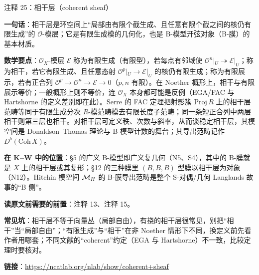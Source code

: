 \begin{kcard}{注释 25：相干层（coherent sheaf）}

\textbf{一句话}：相干层是环空间上“局部由有限个截生成、且任意有限个截之间的核仍有限生成”的 $\mathcal O$-模层；它是有限生成模的几何化，也是 B-模型开弦对象（B-膜）的基本材质。

\textbf{数学要点}：$\mathcal O_X$-模层 $\mathcal E$ 称为有限生成（有限型），若每点有邻域使 $\mathcal O^n|_U\twoheadrightarrow\mathcal E|_U$；称为相干，若它有限生成、且任意态射 $\mathcal O^p|_U\to\mathcal E|_U$ 的核仍有限生成；称为有限展示，若有正合列 $\mathcal O^p\to\mathcal O^n\to\mathcal E\to0$（$p,n$ 有限）。在 Noether 概形上，相干与有限展示等价；一般概形上则不等价，连 $\mathcal O_X$ 本身都可能是反例（EGA/FAC 与 Hartshorne 的定义差别即在此）。Serre 的 FAC 定理把射影簇 $\mathrm{Proj}\,R$ 上的相干层范畴等同于有限生成分次 $R$-模范畴模去有限长度子范畴；同一条短正合列中两层相干则第三层也相干。对相干层可定义秩、次数与斜率，从而谈稳定相干层，其模空间是 Donaldson--Thomas 理论与 B-模型计数的舞台；其导出范畴记作 $D^b(\mathrm{Coh}\,X)$。

\textbf{在 K--W 中的位置}：§5 的广义 B-模型即广义复几何（N5、S4），其中的 B-膜就是 $X$ 上的相干层或其复形；§12 的三种膜里 $(B,B,B)$ 型膜以相干层为对象（N12）。Hitchin 模空间 $\mathcal{M}_H$ 的 B-膜导出范畴是整个 S-对偶/几何 Langlands 故事的“B 侧”。

\textbf{读原文前需要的前置}：注释 13、注释 15。

\textbf{常见坑}：相干层不等于向量丛（局部自由），有挠的相干层很常见，别把“相干”当“局部自由”；“有限生成”与“相干”在非 Noether 情形下不同，换定义前先看作者用哪套；不同文献的“coherent”约定（EGA 与 Hartshorne）不一致，比较定理时要核对。

\noindent\textbf{链接}：\url{https://ncatlab.org/nlab/show/coherent+sheaf}
\end{kcard}

